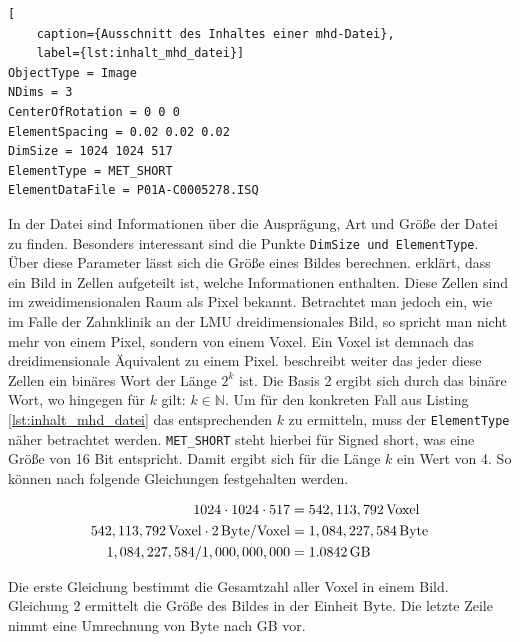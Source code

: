 \begin{lstlisting}[
	caption={Ausschnitt des Inhaltes einer mhd-Datei},
	label={lst:inhalt_mhd_datei}]
ObjectType = Image
NDims = 3
CenterOfRotation = 0 0 0
ElementSpacing = 0.02 0.02 0.02
DimSize = 1024 1024 517
ElementType = MET_SHORT
ElementDataFile = P01A-C0005278.ISQ
\end{lstlisting}

In der Datei sind Informationen über die Ausprägung, Art und Größe der Datei zu
finden. Besonders interessant sind die Punkte \texttt{DimSize und ElementType}. Über
diese Parameter lässt sich die Größe eines Bildes berechnen. \citet[S.~10-11]{burger2009}
erklärt, dass ein Bild in Zellen aufgeteilt ist, welche Informationen enthalten.
Diese Zellen sind im zweidimensionalen Raum als Pixel bekannt. Betrachtet man jedoch
ein, wie im Falle der Zahnklinik an der \ac{LMU} dreidimensionales Bild, so
spricht man nicht mehr von einem Pixel, sondern von einem Voxel. Ein Voxel ist
demnach das dreidimensionale Äquivalent zu einem Pixel. \citet[S.~10-11]{burger2009}
beschreibt weiter das jeder diese Zellen ein binäres Wort der Länge $2^{k}$ ist.
Die Basis 2 ergibt sich durch das binäre Wort, wo hingegen für $k$ gilt: $k \in \mathbb{N}$.
Um für den konkreten Fall aus Listing \ref{lst:inhalt_mhd_datei} das
entsprechenden $k$ zu ermitteln, muss der \texttt{ElementType} näher betrachtet
werden. \texttt{MET\_SHORT} steht hierbei für Signed short, was eine Größe von 16
Bit entspricht. Damit ergibt sich für die Länge $k$ ein Wert von 4. So können
nach \citet[S.~10-11]{burger2009} folgende Gleichungen festgehalten werden.

\begin{align}
	\label{equ:größe_bestimmen}1024 \cdot 1024 \cdot 517    & = 542,113,792 \, \text{Voxel}\notag  \\
	542,113,792 \, \text{Voxel}\cdot 2 \, \text{Byte/Voxel} & = 1,084,227,584 \, \text{Byte}\notag \\
	1,084,227,584 / 1,000,000,000                           & = 1.0842 \, \text{GB}
\end{align}

Die erste Gleichung bestimmt die Gesamtzahl aller Voxel in einem Bild. Gleichung
2 ermittelt die Größe des Bildes in der Einheit Byte. Die letzte Zeile nimmt
eine Umrechnung von Byte nach \ac{GB} vor.

